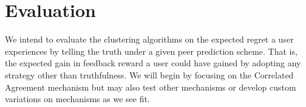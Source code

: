 \documentclass[a4paper, 12pt]{article}
\begin{document}

\section{Evaluation}
We intend to evaluate the clustering algorithms on the expected regret a user experiences by telling the truth under a given peer prediction scheme. That is, the expected gain in feedback reward a user could have gained by adopting any strategy other than truthfulness. We will begin by focusing on the Correlated Agreement mechanism \citep{shnayder2016informed} but may also test other mechanisms or develop custom variations on mechanisms as we see fit. 




\end{document}

